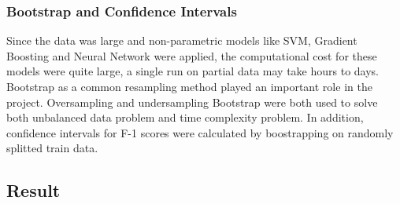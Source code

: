 \documentclass{article}
\begin{document}
\subsubsection{Bootstrap and Confidence Intervals}
Since the data was large and non-parametric models like SVM, Gradient Boosting and Neural Network were applied, the computational cost for these models were quite large, a single run on partial data may take hours to days. Bootstrap as a common resampling method played an important role in the project. Oversampling and undersampling Bootstrap were both used to solve both unbalanced data problem and time complexity problem. In addition, confidence intervals for F-1 scores were calculated by boostrapping on randomly splitted train data.

\subsection{Result}
\end{document}

